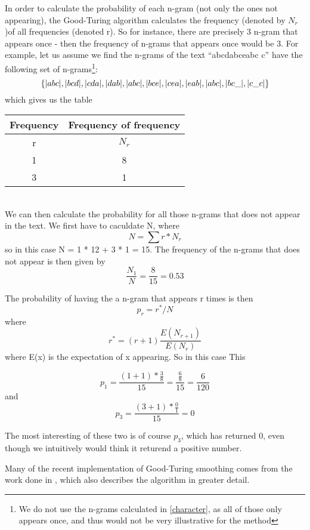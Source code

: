 In order to calculate the probability of each n-gram (not only the ones not appearing), the Good-Turing algorithm calculates the frequency (denoted by $N_r$)of all frequencies (denoted r). So for instance, there are precisely 3 n-gram that appears once - then the frequency of n-grams that appears once would be 3. For example, let us assume we find the n-grams of the text ``abcdabceabc c'' have the following set of n-grams\footnote{We do not use the n-grams calculated in \ref{character}, as all of those only appears once, and thus would not be very illustrative for the method}:\\
$$
\{|abc|, |bcd|, |cda|, |dab|, |abc|, |bce|, |cea|, |eab|, |abc|, |bc\_|, |c\_c| \}
$$
which gives us the table\\
\begin{tabular}{|cc|}
\hline
Frequency & Frequency of frequency \\
\hline
r & $N_{r}$ \\
1 & 8\\
3 & 1\\
\hline
\end{tabular}
\\
We can then calculate the probability for all those n-grams that does not appear in the text. We first have to caculdate N, where 
$$
N = \sum r * N_r
$$
so in this case N = 1 * 12 + 3 * 1 = 15. The frequency of the n-grams that does not appear is then given by 
$$
\frac{N_1}{N} = \frac{8}{15} = 0.53
$$

The probability of having the a n-gram that appears r times is then 
$$p_r = r^*/N$$
 where 
$$r^* = (r+1)\frac{E(N_{r+1})}{E(N_r)}$$
 where E(x) is the expectation of x appearing. So in this case This 

$$p_1 = \frac{(1 + 1) * \frac{3}{8}}{15} = \frac{\frac{6}{8}}{15} = \frac{6}{120}$$ and  
$$p_3 = \frac{(3 + 1) * \frac{0}{1}}{15} = 0$$

The most interesting of these two is of course $p_3$, which has returned 0, even though we intuitively would think it returend a positive number.

Many of the recent implementation of Good-Turing smoothing comes from the work done in \cite{Gale94good-turingsmoothing}, which also describes the algorithm in greater detail.
